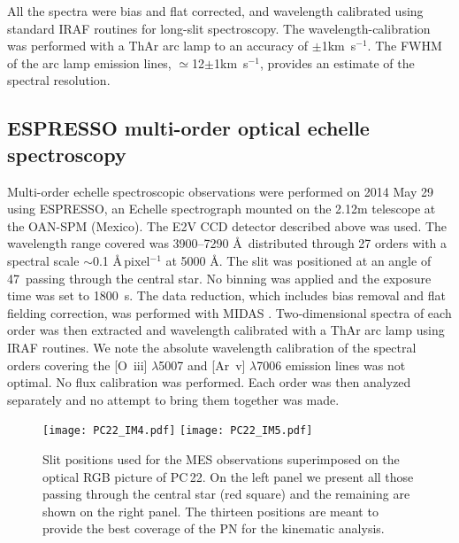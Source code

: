 \documentclass[fleqn,usenatbib,useAMS]{mnras}
\begin{document}
All the spectra were bias and flat corrected, and wavelength calibrated
using standard {\sc IRAF} routines for long-slit spectroscopy.
The wavelength-calibration was performed with a ThAr arc lamp to an
accuracy of $\pm$1km~s$^{-1}$.
The FWHM of the arc lamp emission lines, $\simeq$12$\pm$1km~s$^{-1}$,
provides an estimate of the spectral resolution.


\subsection{ESPRESSO multi-order optical echelle spectroscopy}


Multi-order echelle spectroscopic observations were performed on 2014 May
29 using ESPRESSO, an Echelle spectrograph mounted on the 2.12m telescope
at the OAN-SPM (Mexico).
The E2V CCD detector described above was used.
The wavelength range covered was 3900--7290 \AA\, distributed through
27 orders with a spectral scale $\sim$0.1 \AA\,pixel$^{-1}$ at 5000
\AA.
The slit was positioned at an angle of 47\degr\ passing through the
central star. No binning was applied and the exposure time was set
to 1800~s.
The data reduction, which includes bias removal and flat fielding
correction, was performed with {\sc MIDAS} \citep{Grosbol1989}.  
Two-dimensional spectra of each order was then extracted and wavelength
calibrated with a ThAr arc lamp using {\sc IRAF} routines.
We note the absolute wavelength calibration of the spectral orders
covering the [O~{\sc iii}] $\lambda$5007 and [Ar~{\sc v}] $\lambda$7006
emission lines was not optimal.  
No flux calibration was performed.
Each order was then analyzed separately and no attempt to bring
them together was made.


\begin{figure*}
\begin{center}
\texttt{[image: PC22\_IM4.pdf]}
\texttt{[image: PC22\_IM5.pdf]}
\caption{
Slit positions used for the MES observations superimposed on the optical
RGB picture of PC\,22.
On the left panel we present all those passing through the central star (red square) and the remaining are shown on the right panel. The thirteen positions are meant to provide the best coverage of the PN for the kinematic analysis. }
\label{slits}
\end{center}
\end{figure*} 
\end{document}
